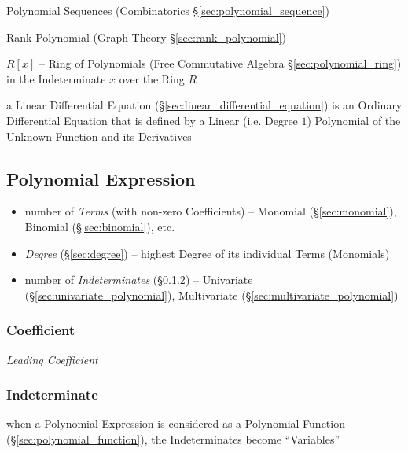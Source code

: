 \fist Polynomial Sequences (Combinatorics \S\ref{sec:polynomial_sequence})

\fist Rank Polynomial (Graph Theory \S\ref{sec:rank_polynomial})

$R[x]$ -- Ring of Polynomials (Free Commutative Algebra
\S\ref{sec:polynomial_ring}) in the Indeterminate $x$ over the Ring $R$

a Linear Differential Equation (\S\ref{sec:linear_differential_equation}) is an
Ordinary Differential Equation that is defined by a Linear (i.e. Degree $1$)
Polynomial of the Unknown Function and its Derivatives



\subsection{Polynomial Expression}\label{sec:polynomial_expression}

\begin{itemize}
  \item number of \emph{Terms} (with non-zero Coefficients) -- Monomial
    (\S\ref{sec:monomial}), Binomial (\S\ref{sec:binomial}), etc.
  \item \emph{Degree} (\S\ref{sec:degree}) -- highest Degree of its individual
    Terms (Monomials)
  \item number of \emph{Indeterminates} (\S\ref{sec:indeterminate}) --
    Univariate (\S\ref{sec:univariate_polynomial}), Multivariate
    (\S\ref{sec:multivariate_polynomial})
\end{itemize}



\subsubsection{Coefficient}\label{sec:coefficient}

\emph{Leading Coefficient}



\subsubsection{Indeterminate}\label{sec:indeterminate}

when a Polynomial Expression is considered as a Polynomial Function
(\S\ref{sec:polynomial_function}), the Indeterminates become ``Variables''



